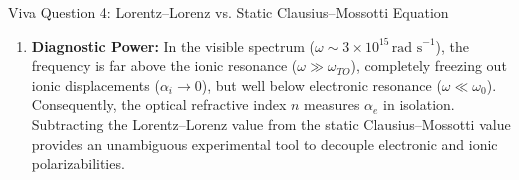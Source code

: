 \documentclass[11pt,a4paper]{article}
\begin{document}
\begin{checkpointbox}{Viva Question 4: Lorentz--Lorenz vs. Static Clausius--Mossotti Equation}
\begin{enumerate}[leftmargin=*]
\begin{itemize}
    \end{itemize}
    \item \textbf{Diagnostic Power:}
    In the visible spectrum ($\omega \sim 3 \times 10^{15}\,\text{rad s}^{-1}$), the frequency is far above the ionic resonance ($\omega \gg \omega_{TO}$), completely freezing out ionic displacements ($\alpha_i \to 0$), but well below electronic resonance ($\omega \ll \omega_0$). Consequently, the optical refractive index $n$ measures $\alpha_e$ in isolation. Subtracting the Lorentz--Lorenz value from the static Clausius--Mossotti value provides an unambiguous experimental tool to decouple electronic and ionic polarizabilities.
\end{enumerate}
\end{checkpointbox}
\end{document}
